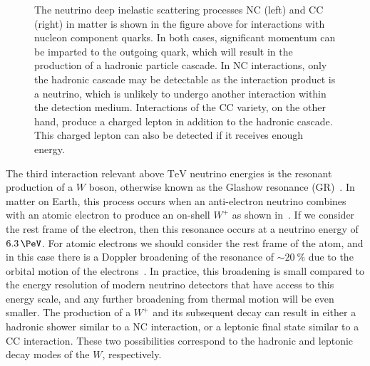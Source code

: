 \begin{figure}
	\centering
	\caption{The neutrino deep inelastic scattering processes NC (left) and CC (right) in matter is shown in the figure above for interactions with nucleon component quarks.
	In both cases, significant momentum can be imparted to the outgoing quark, which will result in the production of a hadronic particle cascade.
	In NC interactions, only the hadronic cascade may be detectable as the interaction product is a neutrino, which is unlikely to undergo another interaction within the detection medium.
	Interactions of the CC variety, on the other hand, produce a charged lepton in addition to the hadronic cascade.
	This charged lepton can also be detected if it receives enough energy.}
	\label{fig:DIS}
\end{figure}

The third interaction relevant above $\si\TeV$ neutrino energies is the resonant production of a $W$ boson, otherwise known as the Glashow resonance (GR)~\cite{Glashow:1960zz}.
In matter on Earth, this process occurs when an anti-electron neutrino combines with an atomic electron to produce an on-shell $W^+$ as shown in~.
If we consider the rest frame of the electron, then this resonance occurs at a neutrino energy of $\SI{6.3}\PeV$.
For atomic electrons we should consider the rest frame of the atom, and in this case there is a Doppler broadening of the resonance of $\sim\SI{20}\percent$ due to the orbital motion of the electrons~\cite{Loewy:2014zva}.
In practice, this broadening is small compared to the energy resolution of modern neutrino detectors that have access to this energy scale, and any further broadening from thermal motion will be even smaller.
The production of a $W^+$ and its subsequent decay can result in either a hadronic shower similar to a NC interaction, or a leptonic final state similar to a CC interaction.
These two possibilities correspond to the hadronic and leptonic decay modes of the $W$, respectively.

